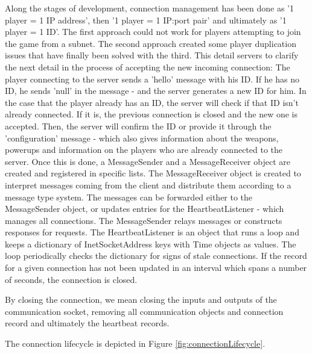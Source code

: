 Along the stages of development, connection management has been done as '1
player = 1 IP address', then '1 player = 1 IP:port pair' and ultimately as '1
player = 1 ID'. The first approach could not work for players attempting to join
the game from a subnet. The second approach created some player duplication
issues that have finally been solved with the third. This detail servers to
clarify the next detail in the process of accepting the new incoming connection:
The player connecting to the server sends a 'hello' message with his ID. If he
has no ID, he sends 'null' in the message - and the server generates a new ID
for him. In the case that the player already has an ID, the server will check if
that ID isn't already connected. If it is, the previous connection is closed and
the new one is accepted. Then, the server will confirm the ID or provide it
through the 'configuration' message - which also gives information about the
weapons, powerups and information on the players who are already connected to
the server. Once this is done, a MessageSender and a MessageReceiver object are
created and registered in specific lists. The MessageReceiver object is created
to interpret messages coming from the client and distribute them according to a
message type system. The messages can be forwarded either to the MessageSender
object, or updates entries for the HeartbeatListener - which manages all
connections. The MessageSender relays messages or constructs responses for
requests. The HeartbeatListener is an object that runs a loop and keeps a
dictionary of InetSocketAddress keys with Time objects as values. The loop
periodically checks the dictionary for signs of stale connections. If the record
for a given connection has not been updated in an interval which spans a number
of seconds, the connection is closed.\newline

By closing the connection, we mean closing the inputs and outputs of the
communication socket, removing all communication objects and connection
record and ultimately the heartbeat records.\newline

The connection lifecycle is depicted in Figure \ref{fig:connectionLifecycle}.

